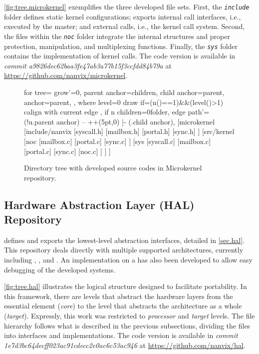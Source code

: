 		\autoref{fig:tree.microkernel} exemplifies the three developed file sets.
		First, the \textit{\texttt{include}} folder defines static kernel configurations;
		exports internal call interfaces, i.e., executed by the master; and
		external calls, i.e., the kernel call system. Second, the files within
		the \textit{\texttt{noc}} folder integrate the internal structures and proper
		protection, manipulation, and multiplexing functions. Finally, the
		\textit{\texttt{sys}} folder contains the implementation of kernel calls.
		The code version
		is available in \textit{commit a9826dec62baa3fe47ab3a77b15f3ccfdd84b79a}
		at \url{https://github.com/nanvix/microkernel}.

		\begin{figure}[!ht]
			\centering%
			\caption{Directory tree with developed source codes in Microkernel repository.}%
			\label{fig:tree.microkernel}%
			\begin{forest}
			for tree={
				grow'=0,
				parent anchor=children,
				child anchor=parent,
				anchor=parent,
			},
			where level=0{
				draw
			}{
				if={(n()==1)&&(level()>1)}{
				calign with current edge
				}{},
				if n children=0{folder}{},
				edge path'={(!u.parent anchor) -- ++(5pt,0) |- (.child anchor)},
			}
			[microkernel
				[include/nanvix
					[syscall.h]
					[mailbox.h]
					[portal.h]
					[sync.h]
				]
				[src/kernel
					[noc
						[mailbox.c]
						[portal.c]
						[sync.c]
					]
					[sys
						[syscall.c]
						[mailbox.c]
						[portal.c]
						[sync.c]
						[noc.c]
					]
				]
			]
			\end{forest}%
		\end{figure}

	\subsection{Hardware Abstraction Layer (HAL) Repository}

		\hal defines and exports the lowest-level abstraction interfaces, detailed
		in \autoref{sec.hal}. This repository deals directly with multiple supported
		architectures, currently including \mppa, \optimsoc, and \hero.
		An implementation on a \unix \os has also been developed to allow easy
		debugging of the developed systems.

		\autoref{fig:tree.hal} illustrates the logical structure designed to
		facilitate \hal portability. In this framework, there are levels that
		abstract the hardware layers from the essential element (\textit{core})
		to the level that abstracts the architecture as a whole (\textit{target}).
		Expressly, this work was restricted to \textit{processor} and
		\textit{target} levels. The file hierarchy follows what is described in
		the previous subsections, dividing the files into interfaces and
		implementations. The code version is available in
		\textit{commit 1e7d3bc64decff023ac91cdecc2e0ac6c53ac946} at
		\url{https://github.com/nanvix/hal}.


